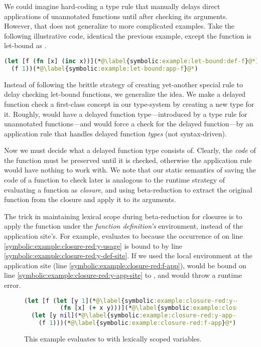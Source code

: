 We could imagine hard-coding a type rule that manually delays
direct applications of unannotated functions until after checking
its arguments.
However, that does not generalize to more complicated examples.
Take the following illustrative code, identical the previous
example, except the function is let-bound as .

{
\begin{lstlisting}[language=Clojure]
(let [f (fn [x] (inc x))](*@\label{symbolic:example:let-bound:def-f}@*)
  (f 1))(*@\label{symbolic:example:let-bound:app-f}@*)
\end{lstlisting}
}

Instead of following the brittle strategy of creating yet-another special rule to delay checking
let-bound functions, we generalize the idea.
We make a delayed function check a first-class concept in our type-system by
creating a new type for it.
Roughly,  would have a delayed function type---introduced by
a type rule for unannotated functions---and 
would force a check for the delayed function---by an application
rule that handles delayed function \emph{types} (not syntax-driven).

Now we must decide what a delayed function type consists of.
Clearly, the \emph{code} of the function must be preserved until
it is checked, otherwise the application rule would have nothing
to work with.
We note that our static semantics of saving
the code of a function to check later
is analogous to the runtime strategy of
evaluating a function as \emph{closure},
and using beta-reduction to extract the original
function from the closure and apply it to its arguments.

The trick in maintaining lexical scope during beta-reduction for closures
is to apply the function under the \emph{function definition's}
environment, instead of the application site's.
For example,
evaluates
to 
because
the occurrence of
 on line \ref{symbolic:example:closure-red:y-usage}
is bound to  by line \ref{symbolic:example:closure-red:y-def-site}.
If we used the local environment at the application site (line \ref{symbolic:example:closure-red:f-app}),
 would be bound on line \ref{symbolic:example:closure-red:y-app-site}
to ,
and would throw a runtime error.

\begin{figure}
{
\lstset{numbers=left,xleftmargin=2em,framexleftmargin=1.5em}
\begin{lstlisting}[language=Clojure]
(let [f (let [y 1](*@\label{symbolic:example:closure-red:y-def-site}@*)
          (fn [x] (+ x y)))](*@\label{symbolic:example:closure-red:y-usage}@*)
  (let [y nil](*@\label{symbolic:example:closure-red:y-app-site}@*)
    (f 1)))(*@\label{symbolic:example:closure-red:f-app}@*)
\end{lstlisting}
}
  \caption{This example evaluates to  with lexically scoped variables.}
  \label{symbolic:example:closure-red}
\end{figure}

